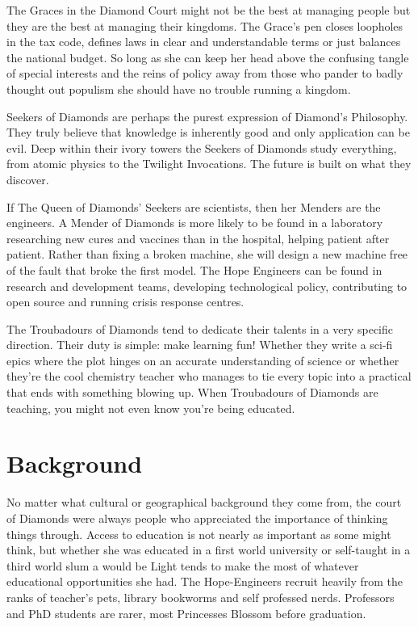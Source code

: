 The Graces in the Diamond Court might not be the best at managing people but they are the best at managing their kingdoms. The Grace's pen closes loopholes in the tax code, defines laws in clear and understandable terms or just balances the national budget. So long as she can keep her head above the confusing tangle of special interests and the reins of policy away from those who pander to badly thought out populism she should have no trouble running a kingdom.

Seekers of Diamonds are perhaps the purest expression of Diamond's Philosophy. They truly believe that knowledge is inherently good and only application can be evil. Deep within their ivory towers the Seekers of Diamonds study everything, from atomic physics to the Twilight Invocations. The future is built on what they discover.

If The Queen of Diamonds' Seekers are scientists, then her Menders are the engineers. A Mender of Diamonds is more likely to be found in a laboratory researching new cures and vaccines than in the hospital, helping patient after patient. Rather than fixing a broken machine, she will design a new machine free of the fault that broke the first model. The Hope Engineers can be found in research and development teams, developing technological policy, contributing to open source and running crisis response centres.

The Troubadours of Diamonds tend to dedicate their talents in a very specific direction. Their duty is simple: make learning fun! Whether they write a sci-fi epics where the plot hinges on an accurate understanding of science or whether they're the cool chemistry teacher who manages to tie every topic into a practical that ends with something blowing up. When Troubadours of Diamonds are teaching, you might not even know you're being educated.

\section*{Background}

No matter what cultural or geographical background they come from, the court of Diamonds were always people who appreciated the importance of thinking things through. Access to education is not nearly as important as some might think, but whether she was educated in a first world university or self-taught in a third world slum a would be Light tends to make the most of whatever educational opportunities she had. The Hope-Engineers recruit heavily from the ranks of teacher's pets, library bookworms and self professed nerds. Professors and PhD students are rarer, most Princesses Blossom before graduation. 

